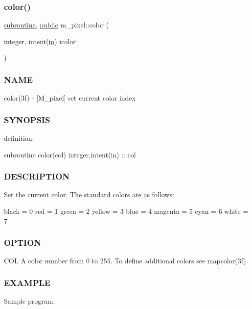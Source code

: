 \subsubsection{\texorpdfstring{color()}{color()}}
{\footnotesize\ttfamily \hyperlink{M__stopwatch_83_8txt_acfbcff50169d691ff02d4a123ed70482}{subroutine}, \hyperlink{M__stopwatch_83_8txt_a2f74811300c361e53b430611a7d1769f}{public} m\+\_\+pixel\+::color (\begin{DoxyParamCaption}\item[{integer, intent(\hyperlink{M__journal_83_8txt_afce72651d1eed785a2132bee863b2f38}{in})}]{icolor }\end{DoxyParamCaption})}



\subsubsection*{N\+A\+ME}

color(3f) -\/ \mbox{[}M\+\_\+pixel\mbox{]} set current color index 

\subsubsection*{S\+Y\+N\+O\+P\+S\+IS}

definition\+:

subroutine color(col) integer,intent(in) \+:\+: col

\subsubsection*{D\+E\+S\+C\+R\+I\+P\+T\+I\+ON}

Set the current color. The standard colors are as follows\+:

black = 0 red = 1 green = 2 yellow = 3 blue = 4 magenta = 5 cyan = 6 white = 7

\subsubsection*{O\+P\+T\+I\+ON}

C\+OL A color number from 0 to 255. To define additional colors see mapcolor(3f).

\subsubsection*{E\+X\+A\+M\+P\+LE}

Sample program\+:

